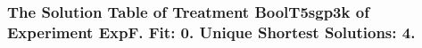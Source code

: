  \begin{frame}
 \fontsize{8pt}{9pt}\selectfont
 \frametitle{ The Solution Table of Treatment BoolT5sgp3k of Experiment ExpF. Fit: 0. Unique Shortest Solutions: 4. }

 \label{ExpFSolutionTable004.tex}  
 \end{frame}


